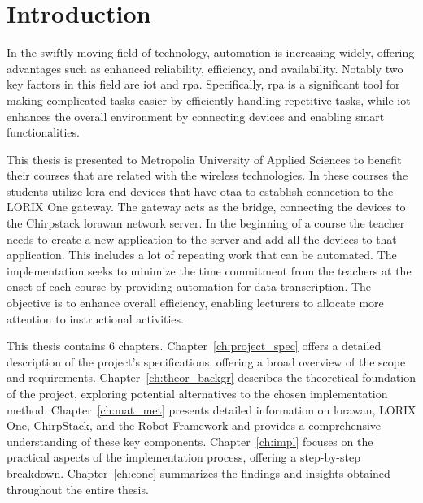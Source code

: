 
\chapter{Introduction}

In the swiftly moving field of technology, automation is increasing widely, offering advantages such as enhanced reliability, efficiency, and availability.
Notably two key factors in this field are  \gls{iot} and \gls{rpa}. Specifically, \gls{rpa} is a significant tool for making complicated tasks easier by efficiently handling repetitive tasks, while \gls{iot} enhances the overall environment by connecting devices and enabling smart functionalities.

This thesis is presented to Metropolia University of Applied Sciences to benefit their courses that are related with the wireless technologies. In these courses the students utilize \gls{lora} end devices that have \gls{otaa} to establish connection to the LORIX One gateway. The gateway acts as the bridge, connecting the devices to the Chirpstack \gls{lorawan} network server. In the beginning of a course the teacher needs to create a new application to the server and add all the devices to that application. This includes a lot of repeating work that can be automated. The implementation seeks to minimize the time commitment from the teachers at the onset of each course by providing automation for data transcription. The objective is to enhance overall efficiency, enabling lecturers to allocate more attention to instructional activities.

This thesis contains 6 chapters. Chapter~\ref{ch:project_spec} offers a detailed description of the project's specifications, offering a broad overview of the scope and requirements. Chapter~\ref{ch:theor_backgr} describes the theoretical foundation of the project, exploring potential alternatives to the chosen implementation method. Chapter~\ref{ch:mat_met} presents detailed information on \gls{lorawan}, LORIX One, ChirpStack, and the Robot Framework and provides a comprehensive understanding of these key components.
Chapter~\ref{ch:impl} focuses on the practical aspects of the implementation process, offering a step-by-step breakdown.
Chapter~\ref{ch:conc} summarizes the findings and insights obtained throughout the entire thesis.


\clearpage %

